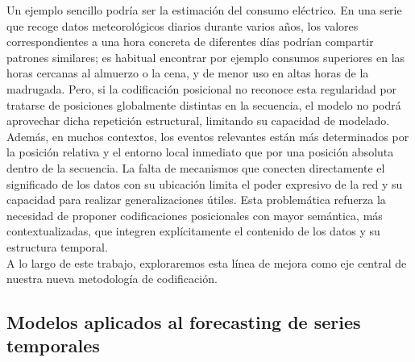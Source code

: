 Un ejemplo sencillo podría ser la estimación del consumo eléctrico. En una serie que recoge datos meteorológicos diarios durante varios años, los valores correspondientes a una hora concreta de diferentes días podrían compartir patrones similares; es habitual encontrar por ejemplo consumos superiores en las horas cercanas al almuerzo o la cena, y de menor uso en altas horas de la madrugada. Pero, si la codificación posicional no reconoce esta regularidad por tratarse de posiciones globalmente distintas en la secuencia, el modelo no podrá aprovechar dicha repetición estructural, limitando su capacidad de modelado.\\

Además, en muchos contextos, los eventos relevantes están más determinados por la posición relativa y el entorno local inmediato que por una posición absoluta dentro de la secuencia. La falta de mecanismos que conecten directamente el significado de los datos con su ubicación limita el poder expresivo de la red y su capacidad para realizar generalizaciones útiles. Esta problemática refuerza la necesidad de proponer codificaciones posicionales con mayor semántica, más contextualizadas, que integren explícitamente el contenido de los datos y su estructura temporal.\\

A lo largo de este trabajo, exploraremos esta línea de mejora como eje central de nuestra nueva metodología de codificación.


\subsection{Modelos aplicados al forecasting de series temporales}